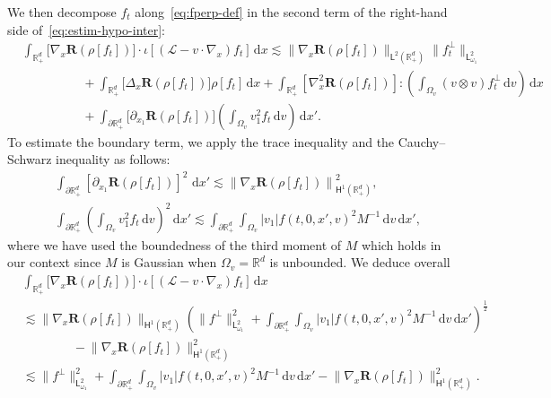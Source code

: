 \documentclass[11pt]{amsart}
\theoremstyle{definition}
\theoremstyle{remark}
\numberwithin{equation}{section}
\newcommand\R{{\mathbb R}}
\newcommand{\dd}{{\, \mathrm d}}
\newcommand{\sfL}{\mathsf{L}}
\newcommand{\sfH}{\mathsf{H}}
\begin{document}
We then decompose $f_t$ along~\eqref{eq:fperp-def} in the second term of the right-hand side of~\eqref{eq:estim-hypo-inter}:
\begin{align*}
  & \int_{\R_+^d} \big[ \nabla_x \mathbf R \left( \rho[f_t] \right) \big] \cdot \iota[(\mathcal L-v \cdot \nabla_x)f_t] \dd x
   \lesssim \big\| \nabla_x \mathbf R \left( \rho[f_t] \right) \big\|_{\sfL^{2}(\R_+^d)} \big\| f^\bot _t \big\|_{\sfL^2_{\omega_1}} \\
  & \hspace{2cm} + \int_{\R_+^d} \big[ \Delta_x \mathbf R \left( \rho[f_t] \right) \big] \rho[f_t] \dd x + \int_{\R_+^d} \left[ \nabla^2 _x \mathbf R \left( \rho[f_t] \right) \right] : \left( \int_{\Omega_v} (v \otimes v) f^\bot_t \dd v \right) \dd x  \\
  & \hspace{2cm} + \int_{\partial \R_+^d} \big[ \partial_{x_1} \mathbf R \left( \rho[f_t] \right) \big] \left( \int_{\Omega_v} v_1^2 f_t \dd v \right) \dd x'.
\end{align*}
To estimate the boundary term, we apply the trace inequality and the Cauchy--Schwarz inequality as follows:
\begin{align*}
  & \int_{\partial \R_+^d} \left[ \partial_{x_1} \mathbf{R} \left( \rho[f_t] \right) \right]^2 \, \dd x' \lesssim \left\| \nabla_x \mathbf{R} \left( \rho[f_t] \right) \right\|_{\sfH^1(\R_+^d)}^2, \\
  & \int_{\partial \R_+^d} \left( \int_{\Omega_v} v_1^2 f_t \dd v \right)^2 \dd x' \lesssim \int_{\partial \R_+^d} \int_{\Omega_v} |v_1| f(t,0,x',v)^2 M^{-1} \dd v \dd x',
\end{align*}
where we have used the boundedness of the third moment of $M$ which holds in our context since $M$ is Gaussian when $\Omega_v=\R^d$ is unbounded. We deduce overall
\begin{align*}
  & \int_{\R_+^d} \big[ \nabla_x \mathbf R \left( \rho[f_t] \right) \big] \cdot \iota[(\mathcal L-v \cdot \nabla_x)f_t] \dd x  \\
  & \lesssim \big\| \nabla_x \mathbf R \left( \rho[f_t] \right) \big\|_{\sfH^1(\R_+^d)} \left( \| f^\bot \|_{\sfL^2_{\omega_1}}^2 +  \int_{\partial \R_+^d} \int_{\Omega_v} |v_1| f(t,0,x',v)^2 M^{-1} \dd v \dd x' \right)^{\frac12} \\
  &\qquad\qquad- \big\| \nabla_x \mathbf R \left( \rho[f_t] \right) \big\|_{\sfH^1(\R_+^d)}^2 \\
  & \lesssim \| f^\bot  \|_{\sfL^2_{\omega_1}}^2 + \int_{\partial \R_+^d} \int_{\Omega_v} |v_1| f(t,0,x',v)^2 M^{-1} \dd v \dd x' 
    - \big\| \nabla_x \mathbf R \left( \rho[f_t] \right) \big\|_{\sfH^1(\R_+^d)}^2.
\end{align*}
\end{document}
